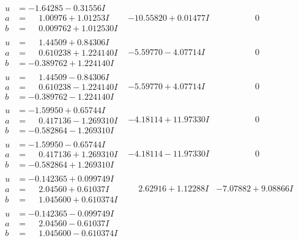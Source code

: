 \documentclass[1p]{elsarticle_modified}
\theoremstyle{definition}
\begin{document}
$$\begin{array}{c|c|c}
\begin{aligned}
u &= -1.64285 - 0.31556 I \\
a &= \phantom{-}1.00976 + 1.01253 I \\
b &= \phantom{-}0.009762 + 1.012530 I\end{aligned}
 & -10.55820 + 0.01477 I & \phantom{-0.000000 } 0 \\ \hline\begin{aligned}
u &= \phantom{-}1.44509 + 0.84306 I \\
a &= \phantom{-}0.610238 + 1.224140 I \\
b &= -0.389762 + 1.224140 I\end{aligned}
 & -5.59770 - 4.07714 I & \phantom{-0.000000 } 0 \\ \hline\begin{aligned}
u &= \phantom{-}1.44509 - 0.84306 I \\
a &= \phantom{-}0.610238 - 1.224140 I \\
b &= -0.389762 - 1.224140 I\end{aligned}
 & -5.59770 + 4.07714 I & \phantom{-0.000000 } 0 \\ \hline\begin{aligned}
u &= -1.59950 + 0.65744 I \\
a &= \phantom{-}0.417136 - 1.269310 I \\
b &= -0.582864 - 1.269310 I\end{aligned}
 & -4.18114 + 11.97330 I & \phantom{-0.000000 } 0 \\ \hline\begin{aligned}
u &= -1.59950 - 0.65744 I \\
a &= \phantom{-}0.417136 + 1.269310 I \\
b &= -0.582864 + 1.269310 I\end{aligned}
 & -4.18114 - 11.97330 I & \phantom{-0.000000 } 0 \\ \hline\begin{aligned}
u &= -0.142365 + 0.099749 I \\
a &= \phantom{-}2.04560 + 0.61037 I \\
b &= \phantom{-}1.045600 + 0.610374 I\end{aligned}
 & \phantom{-}2.62916 + 1.12288 I & -7.07882 + 9.08866 I \\ \hline\begin{aligned}
u &= -0.142365 - 0.099749 I \\
a &= \phantom{-}2.04560 - 0.61037 I \\
b &= \phantom{-}1.045600 - 0.610374 I\end{aligned}

\end{array}$$
\end{document}
